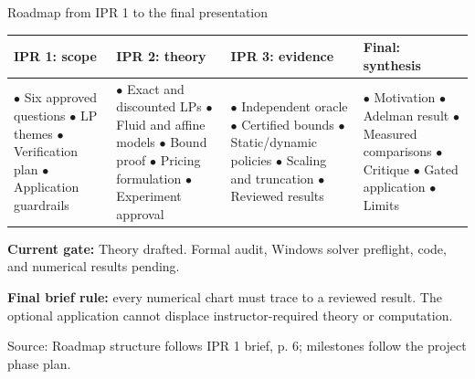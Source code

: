\documentclass[aspectratio=169,10pt]{beamer}
\newcommand{\src}[1]{\par\vfill{\tiny\color{muted}Source: #1\par}}
\begin{document}
\begin{frame}[t]{Roadmap from IPR 1 to the final presentation}
\footnotesize
\begin{tabularx}{\textwidth}{@{}p{}p{}p{}X@{}}
\toprule
IPR 1: scope & IPR 2: theory & IPR 3: evidence & Final: synthesis\\
\midrule
\(\bullet\) Six approved questions\newline
\(\bullet\) LP themes\newline
\(\bullet\) Verification plan\newline
\(\bullet\) Application guardrails
&
\(\bullet\) Exact and discounted LPs\newline
\(\bullet\) Fluid and affine models\newline
\(\bullet\) Bound proof\newline
\(\bullet\) Pricing formulation\newline
\(\bullet\) Experiment approval
&
\(\bullet\) Independent oracle\newline
\(\bullet\) Certified bounds\newline
\(\bullet\) Static/dynamic policies\newline
\(\bullet\) Scaling and truncation\newline
\(\bullet\) Reviewed results
&
\(\bullet\) Motivation\newline
\(\bullet\) Adelman result\newline
\(\bullet\) Measured comparisons\newline
\(\bullet\) Critique\newline
\(\bullet\) Gated application\newline
\(\bullet\) Limits
\\
\bottomrule
\end{tabularx}
\vspace{0.9em}
\textbf{Current gate:} Theory drafted. Formal audit, Windows solver preflight, code, and numerical results pending.
\medskip\par
\textbf{Final brief rule:} every numerical chart must trace to a reviewed result. The optional application cannot displace instructor-required theory or computation.
\src{Roadmap structure follows IPR 1 brief, p. 6; milestones follow the project phase plan.}
\end{frame}
\end{document}
